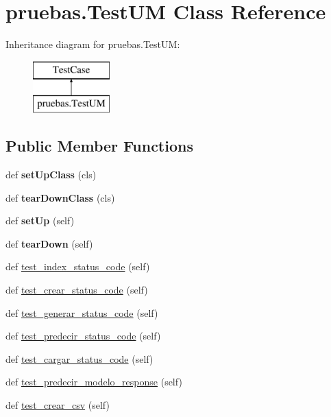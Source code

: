 \hypertarget{classpruebas_1_1_test_u_m}{}\section{pruebas.\+Test\+UM Class Reference}
\label{classpruebas_1_1_test_u_m}
Inheritance diagram for pruebas.\+Test\+UM\+:\begin{figure}[H]
\begin{center}
\leavevmode
\includegraphics[height=2.000000cm]{classpruebas_1_1_test_u_m}
\end{center}
\end{figure}
\subsection*{Public Member Functions}
\begin{DoxyCompactItemize}
\item 
\mbox{\label{classpruebas_1_1_test_u_m_abf7b7300fd629dbef481ff2911f52c44}} 
def {\bfseries set\+Up\+Class} (cls)
\item 
\mbox{\label{classpruebas_1_1_test_u_m_a9975a254d78eacbd716dd6caba80e243}} 
def {\bfseries tear\+Down\+Class} (cls)
\item 
\mbox{\label{classpruebas_1_1_test_u_m_a977b0959979bf20a4e5e5ecc8e282e30}} 
def {\bfseries set\+Up} (self)
\item 
\mbox{\label{classpruebas_1_1_test_u_m_a0c5a9ed1a1b48a938c7b0f888cbd49f1}} 
def {\bfseries tear\+Down} (self)
\item 
def \hyperlink{classpruebas_1_1_test_u_m_a4cecf42b50d10428f2e5c1efca0ce59c}{test\+\_\+index\+\_\+status\+\_\+code} (self)
\item 
def \hyperlink{classpruebas_1_1_test_u_m_a152091a0b91cda976f0ef41a6feef968}{test\+\_\+crear\+\_\+status\+\_\+code} (self)
\item 
def \hyperlink{classpruebas_1_1_test_u_m_a3aa8f257e52cba3f778181f02241ce63}{test\+\_\+generar\+\_\+status\+\_\+code} (self)
\item 
def \hyperlink{classpruebas_1_1_test_u_m_a775d549dfd6d3b2822c5e1579552f6a8}{test\+\_\+predecir\+\_\+status\+\_\+code} (self)
\item 
def \hyperlink{classpruebas_1_1_test_u_m_af0e1b161b7a46c48fe74e9cda7d5cd4c}{test\+\_\+cargar\+\_\+status\+\_\+code} (self)
\item 
def \hyperlink{classpruebas_1_1_test_u_m_a0cda9b35bc5adad4dc7d08c1c6b4bfa8}{test\+\_\+predecir\+\_\+modelo\+\_\+response} (self)
\item 
def \hyperlink{classpruebas_1_1_test_u_m_aeb181c390d170aed40acc8de970abfe1}{test\+\_\+crear\+\_\+csv} (self)
\end{DoxyCompactItemize}
